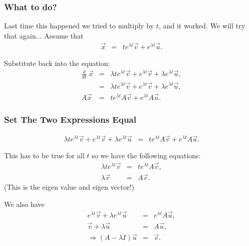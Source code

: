 \documentclass{beamer}
\newcommand{\deriv}[2]{\frac{d}{d#2}#1}
\newcommand{\lp}{\left(}
\newcommand{\rp}{\right)}
\begin{document}
\begin{frame}
  \frametitle{What to do?}

  Last time this happened we tried to multiply by $t$, and it
  worked. We will try that again...
  Assume that
  \begin{eqnarray*}
    \vec{x} & = & t e^{\lambda t} \vec{v} + e^{\lambda t} \vec{u}.
  \end{eqnarray*}

  {
    Substitute back into the equation:
    \begin{eqnarray*}
      \deriv{~}{t} \vec{x} & = & \lambda t e^{\lambda t} \vec{v} + e^{\lambda t} \vec{v} 
         + \lambda e^{\lambda t} \vec{u}, \\
         & = & 
      \lambda t e^{\lambda t} \vec{v} + e^{\lambda t} \vec{v} + \lambda e^{\lambda t} \vec{u}, \\
      A\vec{x} & = & t e^{\lambda t} A \vec{v} + e^{\lambda t} A \vec{u}.
    \end{eqnarray*}
  }
  
\end{frame}


\begin{frame}
  \frametitle{Set The Two Expressions Equal}

    \begin{eqnarray*}
      \lambda t e^{\lambda t} \vec{v} + e^{\lambda t} \vec{v} + \lambda e^{\lambda t} \vec{u}
      & = & 
      t e^{\lambda t} A \vec{v} + e^{\lambda t} A \vec{u}.
    \end{eqnarray*}
  
    This has to be true for all $t$ so we have the following equations:
    \begin{eqnarray*}
      \lambda t e^{\lambda t} \vec{v} & = & t e^{\lambda t} A \vec{v}, \\
      \lambda \vec{v} & = & A \vec{v}.
    \end{eqnarray*}
    (This is the eigen value and eigen vector!)

    We also have 
    \begin{eqnarray*}
      e^{\lambda t} \vec{v} + \lambda e^{\lambda t} \vec{u} & = & e^{\lambda t} A \vec{u}, \\
      \vec{v} + \lambda \vec{u} & = &  A \vec{u}, \\
      \Rightarrow \lp A - \lambda I \rp \vec{u} & = & \vec{v}.
    \end{eqnarray*}

\end{frame}
\end{document}
